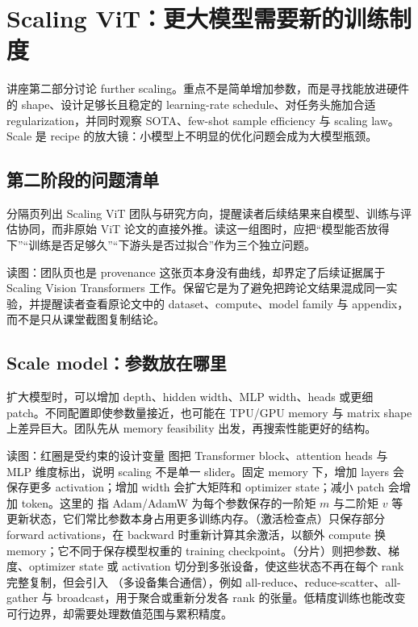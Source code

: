 \section{Scaling ViT：更大模型需要新的训练制度}

讲座第二部分讨论 further scaling。重点不是简单增加参数，而是寻找能放进硬件的 shape、设计足够长且稳定的 learning-rate schedule、对任务头施加合适 regularization，并同时观察 SOTA、few-shot sample efficiency 与 scaling law。Scale 是 recipe 的放大镜：小模型上不明显的优化问题会成为大模型瓶颈。

\subsection{第二阶段的问题清单}

分隔页列出 Scaling ViT 团队与研究方向，提醒读者后续结果来自模型、训练与评估协同，而非原始 ViT 论文的直接外推。读这一组图时，应把“模型能否放得下”“训练是否足够久”“下游头是否过拟合”作为三个独立问题。


\begin{knowledgebox}{读图：团队页也是 provenance}
这张页本身没有曲线，却界定了后续证据属于 Scaling Vision Transformers 工作。保留它是为了避免把跨论文结果混成同一实验，并提醒读者查看原论文中的 dataset、compute、model family 与 appendix，而不是只从课堂截图复制结论。
\end{knowledgebox}

\subsection{Scale model：参数放在哪里}

扩大模型时，可以增加 depth、hidden width、MLP width、heads 或更细 patch。不同配置即使参数量接近，也可能在 TPU/GPU memory 与 matrix shape 上差异巨大。团队先从 memory feasibility 出发，再搜索性能更好的结构。


\begin{knowledgebox}{读图：红圈是受约束的设计变量}
图把 Transformer block、attention heads 与 MLP 维度标出，说明 scaling 不是单一 slider。固定 memory 下，增加 layers 会保存更多 activation；增加 width 会扩大矩阵和 optimizer state；减小 patch 会增加 token。这里的  指 Adam/AdamW 为每个参数保存的一阶矩 $m$ 与二阶矩 $v$ 等更新状态，它们常比参数本身占用更多训练内存。（激活检查点）只保存部分 forward activations，在 backward 时重新计算其余激活，以额外 compute 换 memory；它不同于保存模型权重的 training checkpoint。（分片）则把参数、梯度、optimizer state 或 activation 切分到多张设备，使这些状态不再在每个 rank 完整复制，但会引入 （多设备集合通信），例如 all-reduce、reduce-scatter、all-gather 与 broadcast，用于聚合或重新分发各 rank 的张量。低精度训练也能改变可行边界，却需要处理数值范围与累积精度。
\end{knowledgebox}

